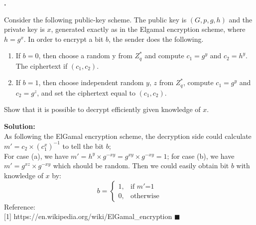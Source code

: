 \documentclass{article}
\newcounter{pcounter}                                   %
\newenvironment{problem}                                %
{                                                       %
    \color{gray}                                        %
    \stepcounter{pcounter}                              %
    \textbf{\arabic{pcounter}.}                         %
}{}                                                     %
\newenvironment{solution}                               %
{\textbf{Solution:} \\}{$\blacksquare$\newline}         %
\begin{document}
    \begin{problem}
        Consider the following public-key scheme. The public key is $(G, p, g, h)$ and the private key is $x$, generated exactly as in the Elgamal encryption scheme, where $h=g^x$. In order to encrypt a bit $b$, the sender does the following.

        \begin{enumerate}[label=(\alph*)]
            \item If $b=0$, then choose a random y from $Z_q^*$ and compute $c_1=g^y$ and $c_2=h^y$. The ciphertext if $(c_1, c_2)$.
            \item If $b=1$, then choose independent random $y$, $z$ from $Z_q^*$, compute $c_1=g^y$ and $c_2=g^z$, and set the ciphertext equal to $(c_1, c_2)$.
        \end{enumerate}

        Show that it is possible to decrypt efficiently given knowledge of $x$.
    \end{problem}

    \begin{solution}
        As following the ElGamal encryption scheme, the decryption side could calculate $m' = c_2 \times (c_1^x)^{-1}$ to tell the bit $b$;\\
        For case (a), we have $m' = h^y \times g^{-xy} = g^{xy} \times g^{-xy} = 1$; for case (b), we have $m' = g^{xz} \times g^{-xy}$ which should be random.
        Then we could easily obtain bit $b$ with knowledge of $x$ by:
        $$
            b = \begin{cases}
                1, &\text{if $m'$=1} \\
                0, &\text{otherwise}
            \end{cases}
        $$
        Reference:\\
        {[1] https://en.wikipedia.org/wiki/ElGamal\_encryption}
    \end{solution}
\end{document}
